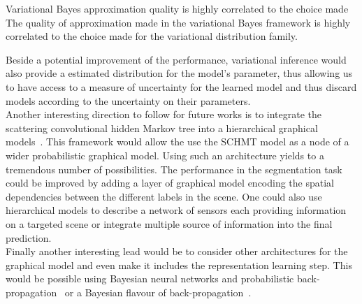 \documentclass[a4paper,11pt]{report}
\begin{document}
			Variational Bayes approximation quality is highly correlated to the choice made 
			The quality of approximation made in the variational Bayes framework is highly correlated to the choice made for the variational distribution family. 
			
			


			
			
			
			Beside a potential improvement of the performance, variational inference would also provide a estimated distribution for the model's parameter, thus allowing us to have access to a measure of uncertainty for the learned model and thus discard models according to the uncertainty on their parameters.\\
		
		Another interesting direction to follow for future works is to integrate the scattering convolutional hidden Markov tree into a hierarchical graphical models~\cite{fine1998hierarchical}. This framework would allow the use the SCHMT model as a node of a wider probabilistic graphical model. Using such an architecture yields to a tremendous number of possibilities. The performance in the segmentation task could be improved by adding a layer of graphical model encoding the spatial dependencies between the different labels in the scene. One could also use hierarchical models to describe a network of sensors each providing information on a targeted scene or integrate multiple source of information into the final prediction.\\
		
		Finally another interesting lead would be to consider other architectures for the graphical model and even make it includes the representation learning step. This would be possible using Bayesian neural networks and probabilistic back-propagation~\cite{hernandez2015probabilistic} or a Bayesian flavour of back-propagation~\cite{blundell2015weight}.
    
\renewcommand\bibname{Bibliography:}

\nocite{*}
\end{document}
